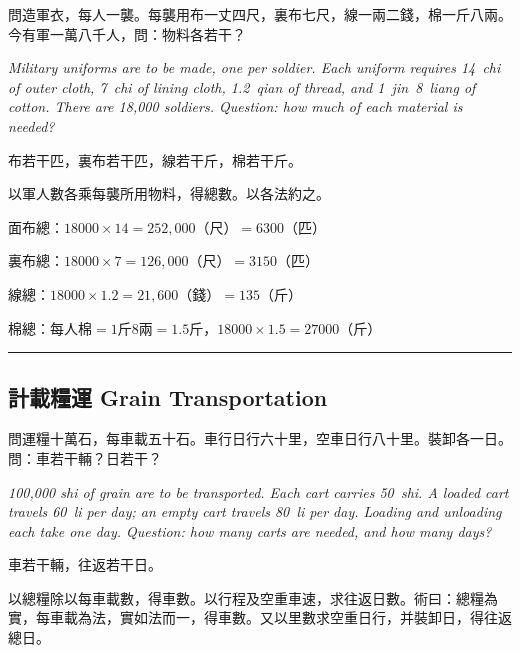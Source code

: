 \documentclass[11pt,a4paper]{article}
\newcommand{\longline}{\noindent\rule{\textwidth}{0.4pt}}
\begin{document}
\begin{problem}
問造軍衣，每人一襲。每襲用布一丈四尺，裏布七尺，線一兩二錢，棉一斤八兩。今有軍一萬八千人，問：物料各若干？

\textit{Military uniforms are to be made, one per soldier. Each uniform requires 14~chi of outer cloth, 7~chi of lining cloth, 1.2~qian of thread, and 1~jin~8~liang of cotton. There are 18{,}000 soldiers. Question: how much of each material is needed?}
\end{problem}

\begin{answer}
布若干匹，裏布若干匹，線若干斤，棉若干斤。
\end{answer}

\begin{method}
以軍人數各乘每襲所用物料，得總數。以各法約之。
\end{method}

\begin{working}
面布總：$18000 \times 14 = 252{,}000$（尺）$= 6300$（匹）

裏布總：$18000 \times 7 = 126{,}000$（尺）$= 3150$（匹）

線總：$18000 \times 1.2 = 21{,}600$（錢）$= 135$（斤）

棉總：每人棉$= 1$斤$8$兩$= 1.5$斤，$18000 \times 1.5 = 27000$（斤）
\end{working}

\vspace{0.5em}
\longline

\subsection{計載糧運 \quad Grain Transportation}

\begin{problem}
問運糧十萬石，每車載五十石。車行日行六十里，空車日行八十里。裝卸各一日。問：車若干輛？日若干？

\textit{100{,}000 shi of grain are to be transported. Each cart carries 50~shi. A loaded cart travels 60~li per day; an empty cart travels 80~li per day. Loading and unloading each take one day. Question: how many carts are needed, and how many days?}
\end{problem}

\begin{answer}
車若干輛，往返若干日。
\end{answer}

\begin{method}
以總糧除以每車載數，得車數。以行程及空重車速，求往返日數。術曰：總糧為實，每車載為法，實如法而一，得車數。又以里數求空重日行，并裝卸日，得往返總日。
\end{method}
\end{document}
